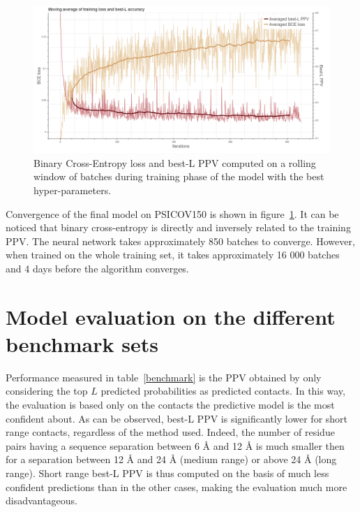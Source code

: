     \begin{figure}[H]
        \begin{center}
            \includegraphics[width=\textwidth, keepaspectratio]{imgs/loss.png}
            \caption{Binary Cross-Entropy loss and best-L PPV computed on
              a rolling window of batches during training phase of the model
              with the best hyper-parameters.}
            \label{lossandppv}
        \end{center}
    \end{figure}

    Convergence of the final model on PSICOV150 is shown in figure~\ref{lossandppv}.
    It can be noticed that binary cross-entropy is directly and inversely
    related to the training PPV. The neural network takes approximately 850
    batches to converge. However, when trained on the whole training set, it takes
    approximately 16 000 batches and 4 days before the algorithm converges.

\section{Model evaluation on the different benchmark sets}

    Performance measured in table~\ref{benchmark} is the PPV obtained
    by only considering the top $L$ predicted probabilities as predicted
    contacts. In this way, the evaluation is based only on the contacts
    the predictive model is the most confident about.
    As can be observed, best-L PPV is significantly lower for short range contacts,
    regardless of the method used. Indeed, the number of residue pairs having a
    sequence separation between 6 \AA{} and 12 \AA{} is much smaller then for a
    separation between 12 \AA{} and 24 \AA{} (medium range) or above 24 \AA{} (long range).
    Short range best-L PPV is thus computed on the basis of much less confident
    predictions than in the other cases, making the evaluation much more disadvantageous.

